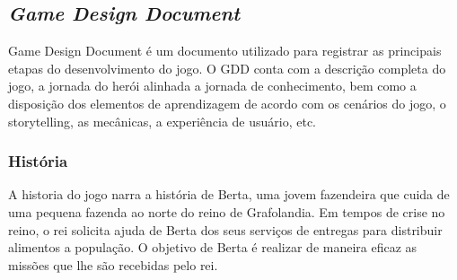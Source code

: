 \documentclass[10pt, conference, compsocconf]{IEEEtran}
\begin{document}
\begin{itemize}

	
\end{itemize}

\subsection{\textit{Game Design Document}} \label{gdd}
Game Design Document é um documento utilizado para registrar as principais etapas do desenvolvimento do jogo. O GDD conta com a descrição completa do jogo, a jornada do herói alinhada a jornada de conhecimento, bem como a disposição dos elementos de aprendizagem de acordo com os cenários do jogo, o storytelling, as mecânicas, a experiência de usuário, etc. 

\subsubsection{História}
A historia do jogo narra a história de Berta, uma jovem fazendeira que cuida de uma pequena fazenda ao norte do reino de Grafolandia. Em tempos de crise no reino, o rei solicita ajuda de Berta dos seus serviços de entregas para distribuir alimentos a população. O objetivo de Berta é realizar de maneira eficaz as missões que lhe são recebidas pelo rei.
\end{document}
